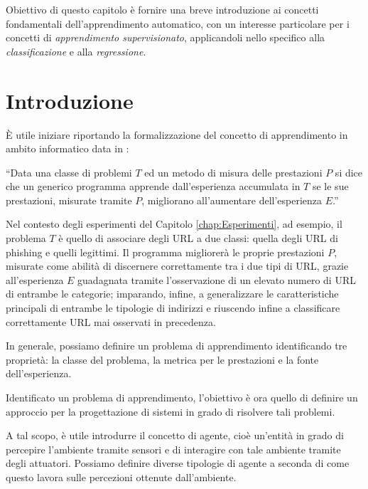 \documentclass[../../main.tex]{subfiles}
\begin{document}
    Obiettivo di questo capitolo è fornire una breve introduzione ai concetti fondamentali dell'apprendimento automatico, con un interesse particolare per i concetti di \textit{apprendimento supervisionato}, applicandoli nello specifico alla \textit{classificazione} e alla \textit{regressione}.

    \section{Introduzione}

    È utile iniziare riportando la formalizzazione del concetto di apprendimento in ambito informatico data in \cite{Mitchell97}:
    
    ``Data una classe di problemi $T$ ed un metodo di misura delle prestazioni $P$ si dice che un generico programma apprende dall'esperienza accumulata in $T$ se le sue prestazioni, misurate tramite $P$, migliorano all'aumentare dell'esperienza $E$.'' 

    Nel contesto degli esperimenti del Capitolo \ref{chap:Esperimenti}, ad esempio, il problema $T$ è quello di associare degli URL a due classi: quella degli URL di phishing e quelli legittimi. Il programma migliorerà le proprie prestazioni $P$, misurate come abilità di discernere correttamente tra i due tipi di URL, grazie all'esperienza  $E$ guadagnata tramite l'osservazione di un elevato numero di URL di entrambe le categorie; imparando, infine, a generalizzare le caratteristiche principali di entrambe le tipologie di indirizzi e riuscendo infine a classificare correttamente  URL mai osservati in precedenza.

    In generale, possiamo definire un problema di apprendimento identificando tre proprietà: la classe del problema, la metrica per le prestazioni e la fonte dell'esperienza.

    Identificato un problema di apprendimento, l'obiettivo è ora quello di definire un approccio per la progettazione di sistemi in grado di risolvere tali problemi.

    A tal scopo, è utile introdurre il concetto di agente, cioè un'entità in grado di percepire l'ambiente tramite sensori e di interagire con tale ambiente tramite degli attuatori. Possiamo definire diverse tipologie di agente a seconda di come questo lavora sulle percezioni ottenute dall'ambiente.
\end{document}
